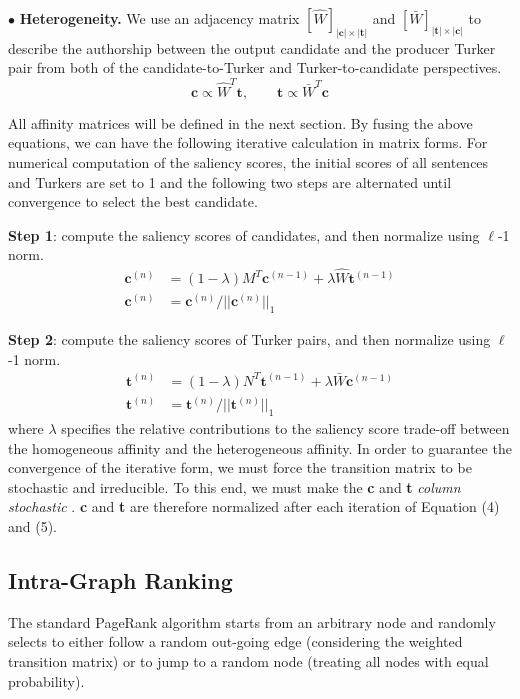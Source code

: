 \documentclass[11pt]{article}
\begin{document}
$\bullet$ \textbf{Heterogeneity.} We use an adjacency matrix $[\hat{W}]_{|\textbf{c}| \times |\textbf{t}|}$ and $[\bar{W}]_{|\textbf{t}|\times |\textbf{c}|}$ to describe the authorship between the output candidate and the producer Turker pair from both of the candidate-to-Turker and Turker-to-candidate perspectives.
\begin{equation}
\textbf{c} \propto \hat{W}^{T} \textbf{t}, \qquad \textbf{t} \propto \bar{W}^{T} \textbf{c}
\end{equation}

All affinity matrices will be defined in the next section. By fusing the above equations, we can have the following iterative calculation in matrix forms. For numerical computation of the saliency scores, the initial scores of all sentences and Turkers are set to 1 and the following two steps are alternated until convergence to select the best candidate.

\textbf{Step 1}: compute the saliency scores of candidates, and then normalize using $\ell$-1 norm.
\begin{equation}
\begin{aligned}
\textbf{c}^{(n)}&=(1-\lambda) {M}^{T}\textbf{c}^{(n-1)}+\lambda \hat{W}\textbf{t}^{(n-1)}\\
\textbf{c}^{(n)}&=\textbf{c}^{(n)}/||\textbf{c}^{(n)}||_1
\end{aligned}
\end{equation}

\textbf{Step 2}: compute the saliency scores of Turker pairs, and then normalize using $\ell$-1 norm.
\begin{equation}
\begin{aligned}
\textbf{t}^{(n)}&=(1-\lambda) {N}^{T}\textbf{t}^{(n-1)}+\lambda \bar{W}\textbf{c}^{(n-1)}\\
\textbf{t}^{(n)}&=\textbf{t}^{(n)}/||\textbf{t}^{(n)}||_1
\end{aligned}
\end{equation} where $\lambda$ specifies the relative contributions to the saliency score trade-off between the homogeneous affinity and the heterogeneous affinity. In order to guarantee the convergence of the iterative form, we must force the transition matrix to be stochastic and irreducible. To this end, we must make the \textbf{c} and \textbf{t} \textit{column stochastic} \cite{a20}. \textbf{c} and \textbf{t} are therefore normalized after each iteration of Equation (4) and (5).

\subsection{Intra-Graph Ranking}
The standard PageRank algorithm starts from an arbitrary node and randomly selects to either follow a random out-going edge (considering the weighted transition matrix) or to jump to a random node (treating all nodes with equal probability).
\end{document}

